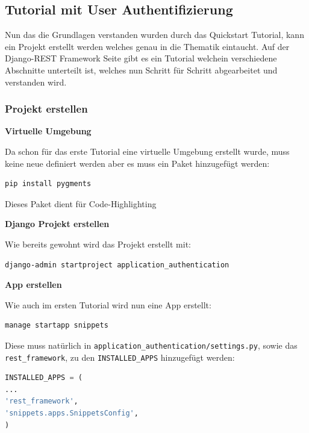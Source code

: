 \subsection{Tutorial mit User Authentifizierung}
Nun das die Grundlagen verstanden wurden durch das Quickstart Tutorial, kann ein Projekt erstellt werden welches genau in die Thematik eintaucht. Auf der Django-REST Framework Seite gibt es ein Tutorial welchein verschiedene Abschnitte unterteilt ist, welches nun Schritt für Schritt abgearbeitet und verstanden wird. 

\subsubsection{Projekt erstellen}
\textbf{Virtuelle Umgebung}

Da schon für das erste Tutorial eine virtuelle Umgebung erstellt wurde, muss keine neue definiert werden aber es muss ein Paket hinzugefügt werden:

\begin{lstlisting}[language=bash]
pip install pygments
\end{lstlisting}

Dieses Paket dient für Code-Highlighting

\textbf{Django Projekt erstellen}

Wie bereits gewohnt wird das Projekt erstellt mit: 

\begin{lstlisting}[language=bash]
django-admin startproject application_authentication
\end{lstlisting}

\textbf{App erstellen}

Wie auch im ersten Tutorial wird nun eine App erstellt:

\begin{lstlisting}[language=bash]
manage startapp snippets
\end{lstlisting}

Diese muss natürlich in \verb|application_authentication/settings.py|, sowie das \verb|rest_framework|, zu den \verb|INSTALLED_APPS| hinzugefügt werden:

\begin{lstlisting}[language=python]
INSTALLED_APPS = (
...
'rest_framework',
'snippets.apps.SnippetsConfig',
)
\end{lstlisting}

